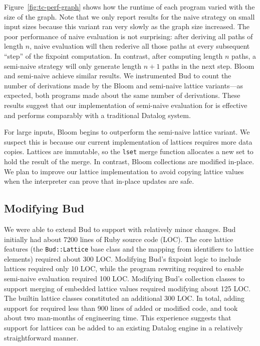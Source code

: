 Figure~\ref{fig:tc-perf-graph} shows how the runtime of each program varied with
the size of the graph. Note that we only report results for the naive \lang
strategy on small input sizes because this variant ran very slowly as the graph
size increased. The poor performance of naive evaluation is not surprising:
after deriving all paths of length $n$, naive evaluation will then rederive all
those paths at every subsequent ``step'' of the fixpoint computation. In
contrast, after computing length $n$ paths, a semi-naive strategy will only
generate length $n+1$ paths in the next step. Bloom and semi-naive \lang achieve
similar results. We instrumented Bud to count the number of derivations made by
the Bloom and semi-naive lattice variants---as expected, both programs made about
the same number of derivations. These results suggest that our implementation of
semi-naive evaluation for \lang is effective and performs comparably with a
traditional Datalog system.

For large inputs, Bloom begins to outperform the semi-naive lattice variant. We
suspect this is because our current implementation of lattices requires more
data copies. Lattices are immutable, so the \texttt{lset} merge function
allocates a new set to hold the result of the merge. In contrast, Bloom
collections are modified in-place. We plan to improve our lattice implementation
to avoid copying lattice values when the interpreter can prove that in-place
updates are safe.

\subsection{Modifying Bud}
We were able to extend Bud to support \lang with relatively minor changes. Bud
initially had about 7200 lines of Ruby source code (LOC). The core lattice
features (the \texttt{Bud::Lattice} base class and the mapping from identifiers
to lattice elements) required about 300 LOC. Modifying Bud's fixpoint logic to
include lattices required only 10 LOC, while the program rewriting required to
enable semi-naive evaluation required 100 LOC. Modifying Bud's collection
classes to support merging of embedded lattice values required modifying about
125 LOC. The builtin lattice classes constituted an additional 300 LOC. In
total, adding support for \lang required less than 900 lines of added or
modified code, and took about two man-months of engineering time. This
experience suggests that support for lattices can be added to an existing
Datalog engine in a relatively straightforward manner.
